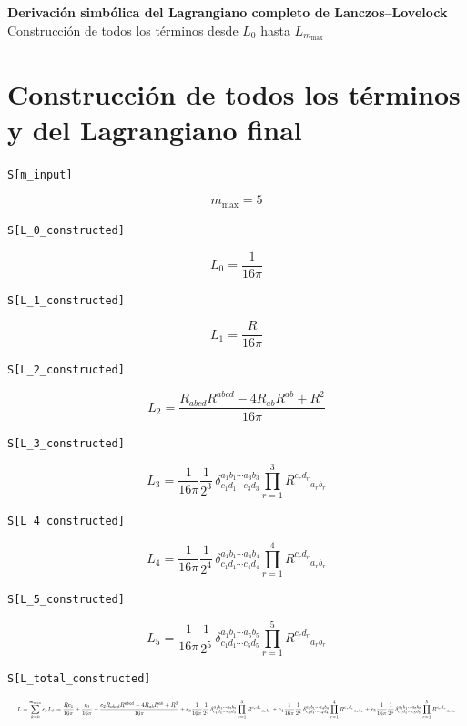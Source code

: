 \documentclass[11pt,a4paper]{article}
\begin{document}
\begin{center}
{\Large\bfseries Derivación simbólica del Lagrangiano completo de Lanczos--Lovelock}\\[0.5em]
{\small Construcción de todos los términos desde $L_0$ hasta $L_{m_{\max}}$}
\end{center}
\section*{Construcción de todos los términos y del Lagrangiano final}

\noindent\texttt{S[m\_input]}

\[
\boxed{m_{\max} = 5}
\]


\noindent\texttt{S[L\_0\_constructed]}

\[
\boxed{L_0 = \frac{1}{16 \pi}}
\]


\noindent\texttt{S[L\_1\_constructed]}

\[
\boxed{L_1 = \frac{R}{16 \pi}}
\]


\noindent\texttt{S[L\_2\_constructed]}

\[
\boxed{L_2 = \frac{R_{abcd}R^{abcd}-4R_{ab}R^{ab}+R^2}{16 \pi}}
\]


\noindent\texttt{S[L\_3\_constructed]}

\[
\boxed{L_3 = \frac{1}{16\pi}\frac{1}{2^{3}}\,\delta^{a_1b_1\cdots a_3b_3}_{c_1d_1\cdots c_3d_3}\prod_{r=1}^{3}R^{c_rd_r}{}_{a_rb_r}}
\]


\noindent\texttt{S[L\_4\_constructed]}

\[
\boxed{L_4 = \frac{1}{16\pi}\frac{1}{2^{4}}\,\delta^{a_1b_1\cdots a_4b_4}_{c_1d_1\cdots c_4d_4}\prod_{r=1}^{4}R^{c_rd_r}{}_{a_rb_r}}
\]


\noindent\texttt{S[L\_5\_constructed]}

\[
\boxed{L_5 = \frac{1}{16\pi}\frac{1}{2^{5}}\,\delta^{a_1b_1\cdots a_5b_5}_{c_1d_1\cdots c_5d_5}\prod_{r=1}^{5}R^{c_rd_r}{}_{a_rb_r}}
\]


\noindent\texttt{S[L\_total\_constructed]}

\[
\resizebox{\textwidth}{!}{$\displaystyle L=\sum_{k=0}^{m_{\max}}c_kL_k = \frac{R c_{1}}{16 \pi} + \frac{c_{0}}{16 \pi} + \frac{c_{2} R_{abcd}R^{abcd}-4R_{ab}R^{ab}+R^2}{16 \pi} + c_{3} \frac{1}{16\pi}\frac{1}{2^{3}}\,\delta^{a_1b_1\cdots a_3b_3}_{c_1d_1\cdots c_3d_3}\prod_{r=1}^{3}R^{c_rd_r}{}_{a_rb_r} + c_{4} \frac{1}{16\pi}\frac{1}{2^{4}}\,\delta^{a_1b_1\cdots a_4b_4}_{c_1d_1\cdots c_4d_4}\prod_{r=1}^{4}R^{c_rd_r}{}_{a_rb_r} + c_{5} \frac{1}{16\pi}\frac{1}{2^{5}}\,\delta^{a_1b_1\cdots a_5b_5}_{c_1d_1\cdots c_5d_5}\prod_{r=1}^{5}R^{c_rd_r}{}_{a_rb_r}$}
\]
\end{document}
